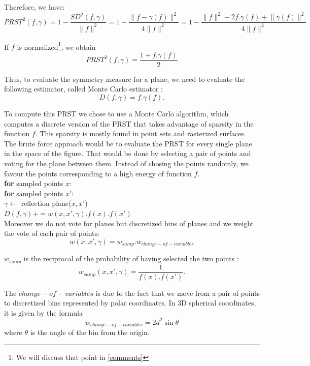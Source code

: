 \documentclass[10pt,a4paper]{article}			%
\begin{document}
Therefore, we have:
$$ PRST^2(f,\gamma) = 1 - \frac{SD^2(f,\gamma)}{\lVert f \lVert ^2} =  1 - \frac{\lVert f - \gamma(f) \lVert ^2 }{4 \lVert f \lVert ^2}	=  1 - \frac{\lVert f \lVert ^2 - 2f.\gamma(f) + \lVert \gamma(f) \lVert ^2 }{4 \lVert f \lVert ^2} $$

If $f$ is normalized\footnote{We will discuss that point in \ref{comments}}, we obtain
\begin{equation}
PRST^2(f,\gamma) = \frac{1 + f.\gamma(f)}{2}
\label{equation_simplifiee}
\end{equation}

	Thus, to evaluate the symmetry measure for a plane, we need to evaluate the following estimator, called Monte Carlo estimator :
$$ D(f,\gamma) = f.\gamma(f). $$
	
	To compute this PRST we chose to use a Monte Carlo algorithm, which computes a discrete version of the PRST that takes advantage of sparsity in the function $f$. This sparsity is mostly found in  point sets and rasterized surfaces.
	The brute force approach would be to evaluate the PRST for every single plane in the space of the figure. That would be done by selecting a pair of points and voting for the plane between them. Instead of chosing the points randomly, we favour the points corresponding to a high energy of function $f$.\\
	

\indent \indent \textbf{for} sampled points $x$:\\
\indent \indent \indent \textbf{for} sampled points $x'$: \\
\indent \indent \indent \indent $\gamma \leftarrow$ reflection plane($x, x'$)\\
\indent \indent \indent \indent $D(f,\gamma) += w(x, x',\gamma).f(x).f(x')$\\
	
Moreover we do not vote for planes but discretized bins of planes and we weight the vote of each pair of points:
$$ w(x, x',\gamma) = w_{samp} . w_{change-of-variables} $$

$w_{samp}$ is the reciprocal of the probability of having selected the two points :
$$w_{samp}(x, x',\gamma) = \frac{1}{f(x).f(x')}. $$

The $change-of-variables$ is due to the fact that we move from a pair of points to discretized bins represented by polar coordinates. In 3D spherical coordinates, it is given by the formula \[w_{change-of-variables} = 2d^2\sin\theta\]
where $\theta$ is the angle of the bin from the origin.\\
\end{document}
